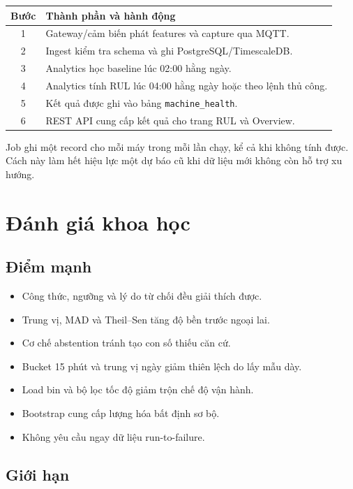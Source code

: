 \documentclass[12pt,a4paper]{article}
\newcommand{\code}[1]{\texttt{#1}}
\begin{document}
\begin{center}
\begin{tabular}{|c|p{}|}
\hline
\textbf{Bước} & \textbf{Thành phần và hành động}\\ \hline
1 & Gateway/cảm biến phát features và capture qua MQTT.\\
2 & Ingest kiểm tra schema và ghi PostgreSQL/TimescaleDB.\\
3 & Analytics học baseline lúc 02:00 hằng ngày.\\
4 & Analytics tính RUL lúc 04:00 hằng ngày hoặc theo lệnh thủ công.\\
5 & Kết quả được ghi vào bảng \code{machine\_health}.\\
6 & REST API cung cấp kết quả cho trang RUL và Overview.\\ \hline
\end{tabular}
\end{center}

Job ghi một record cho mỗi máy trong mỗi lần chạy, kể cả khi không tính được. Cách này làm hết hiệu lực một dự báo cũ khi dữ liệu mới không còn hỗ trợ xu hướng.

\section{Đánh giá khoa học}

\subsection{Điểm mạnh}

\begin{itemize}
  \item Công thức, ngưỡng và lý do từ chối đều giải thích được.
  \item Trung vị, MAD và Theil--Sen tăng độ bền trước ngoại lai.
  \item Cơ chế abstention tránh tạo con số thiếu căn cứ.
  \item Bucket 15 phút và trung vị ngày giảm thiên lệch do lấy mẫu dày.
  \item Load bin và bộ lọc tốc độ giảm trộn chế độ vận hành.
  \item Bootstrap cung cấp lượng hóa bất định sơ bộ.
  \item Không yêu cầu ngay dữ liệu run-to-failure.
\end{itemize}

\subsection{Giới hạn}
\end{document}
